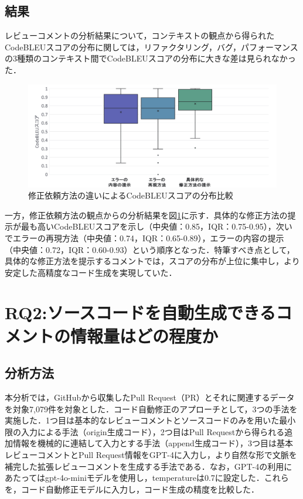 \documentclass[twocolumn]{jarticle} %
\newcommand{\RQtwo}{ソースコードを自動生成できるコメントの情報量はどの程度か}
\begin{document}
\subsection{結果}
レビューコメントの分析結果について，コンテキストの観点から得られたCodeBLEUスコアの分布に関しては，リファクタリング，バグ，パフォーマンスの3種類のコンテキスト間でCodeBLEUスコアの分布に大きな差は見られなかった．


\begin{figure}[htbp]
\centering
\includegraphics[width=0.8\linewidth]{@BSthesis2024_Akamatsu/Akamatsu_figs/rq1_result03_03.png}
\caption{修正依頼方法の違いによるCodeBLEUスコアの分布比較}
\label{fig:method-score}
\end{figure}

一方，修正依頼方法の観点からの分析結果を図\ref{fig:method-score}に示す．具体的な修正方法の提示が最も高いCodeBLEUスコアを示し（中央値：0.85，IQR：0.75-0.95），次いでエラーの再現方法（中央値：0.74，IQR：0.65-0.89），エラーの内容の提示（中央値：0.72，IQR：0.60-0.93）という順序となった．特筆すべき点として，具体的な修正方法を提示するコメントでは，スコアの分布が上位に集中し，より安定した高精度なコード生成を実現していた．


\section{RQ2:\RQtwo}

\subsection{分析方法}
本分析では，GitHubから収集したPull Request（PR）とそれに関連するデータを対象7,079件を対象とした．コード自動修正のアプローチとして，3つの手法を実施した．1つ目は基本的なレビューコメントとソースコードのみを用いた最小限の入力による手法（origin生成コード），2つ目はPull Requestから得られる追加情報を機械的に連結して入力とする手法（append生成コード），3つ目は基本レビューコメントとPull Request情報をGPT-4に入力し，より自然な形で文脈を補完した拡張レビューコメントを生成する手法である．なお，GPT-4の利用にあたってはgpt-4o-miniモデルを使用し，temperatureは0.7に設定した．これらを，コード自動修正モデルに入力し，コード生成の精度を比較した．
\end{document}
